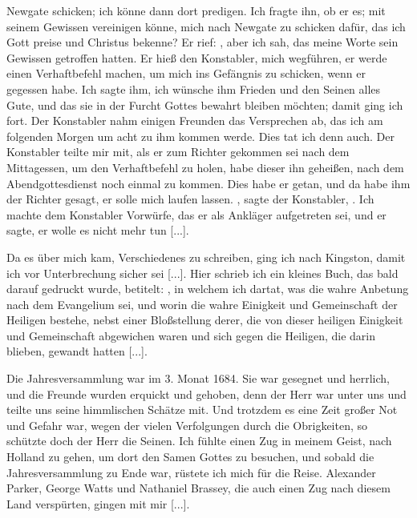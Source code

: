 Newgate schicken; ich könne dann dort predigen. Ich fragte ihn,
ob er es; mit seinem Gewissen vereinigen könne, mich nach 
Newgate zu schicken dafür, das ich Gott preise und Christus bekenne?
Er rief: , aber ich sah, das meine Worte
sein Gewissen getroffen hatten. Er hieß den Konstabler, mich
wegführen, er werde einen Verhaftbefehl machen, um mich ins
Gefängnis zu schicken, wenn er gegessen habe. Ich sagte ihm,
ich wünsche ihm Frieden und den Seinen alles Gute, und das sie
in der Furcht Gottes bewahrt bleiben möchten; damit ging ich
fort. Der Konstabler nahm einigen Freunden das Versprechen
ab, das ich am folgenden Morgen um acht zu ihm kommen werde.
Dies tat ich denn auch. Der Konstabler teilte mir mit, als er
zum Richter gekommen sei nach dem Mittagessen, um den Verhaftbefehl 
zu holen, habe dieser ihn geheißen, nach dem Abendgottesdienst 
noch einmal zu kommen. Dies habe er getan, und da
habe ihm der Richter gesagt, er solle mich laufen lassen. ,
sagte der Konstabler, . Ich machte dem
Konstabler Vorwürfe, das er als Ankläger aufgetreten sei, und
er sagte, er wolle es nicht mehr tun [...].

Da es über mich kam, Verschiedenes zu schreiben, ging ich
nach Kingston, damit ich vor Unterbrechung 
sicher sei [...]. Hier
schrieb ich ein kleines Buch, das bald darauf gedruckt wurde, betitelt: 
, in welchem ich dartat, was die wahre 
Anbetung nach dem Evangelium sei, und worin die wahre Einigkeit
und Gemeinschaft der Heiligen 
bestehe, nebst einer Bloßstellung
derer, die von dieser heiligen Einigkeit und Gemeinschaft 
abgewichen waren und sich gegen die Heiligen, die darin blieben, 
gewandt hatten [...].

Die Jahresversammlung war im 3. Monat 1684. Sie war 
gesegnet und herrlich, und die Freunde wurden erquickt und gehoben,
denn der Herr war unter uns und teilte uns seine himmlischen
Schätze mit. Und trotzdem es eine Zeit großer Not und Gefahr
war, wegen der vielen Verfolgungen durch die Obrigkeiten, so
schützte doch der Herr die Seinen.
Ich fühlte einen Zug in meinem Geist, nach Holland zu gehen,
um dort den Samen Gottes zu besuchen, und sobald die 
Jahresversammlung zu Ende war, rüstete ich mich für die Reise.
Alexander Parker, George
Watts und Nathaniel 
Brassey, die
auch einen Zug nach diesem Land verspürten, gingen mit mir [...].


